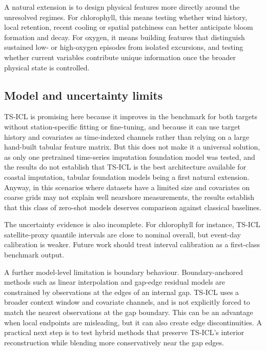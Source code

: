 A natural extension is to design physical features more directly around the unresolved regimes. For
chlorophyll, this means testing whether wind history, local retention, recent cooling or
spatial patchiness can better anticipate bloom formation and decay. For oxygen, it means building
features that distinguish sustained low- or high-oxygen episodes from isolated excursions, and
testing whether current variables contribute unique information once the broader physical
state is controlled.

\subsection{Model and uncertainty limits}
\label{sec:limits_models_uncertainty}

TS-ICL is promising here because it improves in the benchmark for both targets without station-specific fitting or fine-tuning, and because it can use target history and covariates as
time-indexed channels rather than relying on a large hand-built tabular feature matrix. But this
does not make it a universal solution, as only one pretrained time-series imputation foundation model was tested,
and the results do not establish that TS-ICL is the best architecture available for coastal
imputation, tabular foundation models being a first natural extension. Anyway, in this scenarios where datasets have a limited size and covariates on coarse grids may not explain well nearshore measurements, the results establish that this class of zero-shot models deserves comparison against classical baselines.

The uncertainty evidence is also incomplete. For chlorophyll for instance, TS-ICL satellite-proxy quantile
intervals are close to nominal overall, but event-day calibration is weaker. Future work should treat interval calibration as a first-class benchmark output.

A further model-level limitation is boundary behaviour. Boundary-anchored methods such as linear
interpolation and gap-edge residual models are constrained by observations at the edges of an
internal gap. TS-ICL uses a broader context window and covariate channels, and is not explicitly
forced to match the nearest observations at the gap boundary. This can be an advantage when local
endpoints are misleading, but it can also create edge discontinuities. A practical next step is to
test hybrid methods that preserve TS-ICL's interior reconstruction while blending more conservatively near the gap edges.

